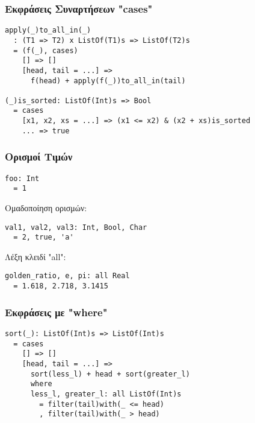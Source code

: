 \documentclass{beamer}
\def\e{\foreignlanguage{english}}
\begin{document}
\begin{frame}[fragile]

\frametitle{Εκφράσεις Συναρτήσεων \e{"cases"}}

\begin{otherlanguage}{english}
\begin{verbatim}
apply(_)to_all_in(_)
  : (T1 => T2) x ListOf(T1)s => ListOf(T2)s
  = (f(_), cases)
    [] => []
    [head, tail = ...] =>
      f(head) + apply(f(_))to_all_in(tail)

(_)is_sorted: ListOf(Int)s => Bool
  = cases
    [x1, x2, xs = ...] => (x1 <= x2) & (x2 + xs)is_sorted
    ... => true
\end{verbatim}
\end{otherlanguage}

\end{frame}

\begin{frame}[fragile]

\frametitle{Ορισμοί Τιμών}

\begin{otherlanguage}{english}
\begin{verbatim}
foo: Int
  = 1
\end{verbatim}
\end{otherlanguage}
Ομαδοποίηση ορισμών:
\begin{otherlanguage}{english}
\begin{verbatim}
val1, val2, val3: Int, Bool, Char
  = 2, true, 'a'
\end{verbatim}
\end{otherlanguage}
Λέξη κλειδί \e{"all"}:
\begin{otherlanguage}{english}
\begin{verbatim}
golden_ratio, e, pi: all Real
  = 1.618, 2.718, 3.1415
\end{verbatim}
\end{otherlanguage}

\end{frame}

\begin{frame}[fragile]

\frametitle{Εκφράσεις με \e{"where"}}

\begin{otherlanguage}{english}
\begin{verbatim}
sort(_): ListOf(Int)s => ListOf(Int)s
  = cases
    [] => []
    [head, tail = ...] =>
      sort(less_l) + head + sort(greater_l)
      where
      less_l, greater_l: all ListOf(Int)s
        = filter(tail)with(_ <= head)
        , filter(tail)with(_ > head)

\end{verbatim}
\end{otherlanguage}

\end{frame}
\end{document}
